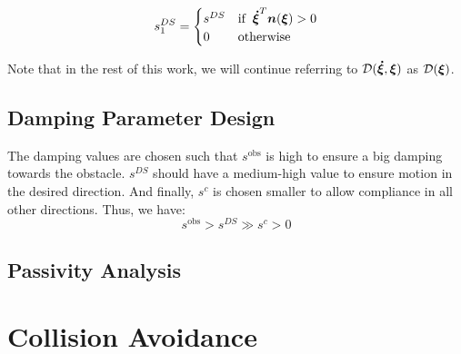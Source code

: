 \documentclass[conference]{IEEEtran}
\begin{document}

\begin{equation}
  s_1^{DS} =
  \begin{cases}
    s^{DS} & \text{if} \;\; \boldsymbol{\dot \xi}^T \boldsymbol{n}(\boldsymbol{\xi}) > 0 \\
    0 & \text{otherwise}
  \end{cases}
\end{equation}

Note that in the rest of this work, we will continue referring to $\mathcal{D}(\boldsymbol{\dot\xi}, \boldsymbol{\xi})$ as $\mathcal{D}(\boldsymbol{\xi})$.


\subsection{Damping Parameter Design}
The damping values are chosen such that $s^{\mathrm{obs}}$ is high to ensure a big damping towards the obstacle. $s^{DS}$ should have a medium-high value to ensure motion in the desired direction. And finally, $s^{c}$ is chosen smaller to allow compliance in all other directions. Thus, we have:
\begin{equation}
s^{\mathrm{obs}} > s^{DS} \gg s^{c} > 0
\end{equation}

\subsection{Passivity Analysis}


\section{Collision Avoidance} \label{sec:collision_avoidance}
\end{document}
